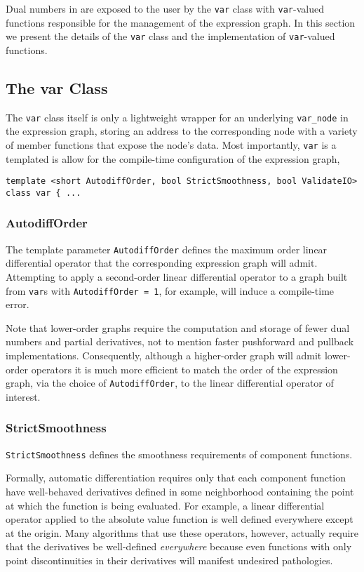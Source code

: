 Dual numbers in \nomad are exposed to the user by the \verb|var|
class with \verb|var|-valued functions responsible for the management
of the expression graph.  In this section we present the details of
the \verb|var| class and the implementation of \verb|var|-valued functions.

\subsection{The var Class}

The \verb|var| class itself is only a lightweight wrapper for an underlying 
\verb|var_node| in the expression graph, storing an address to the 
corresponding node with a variety of member functions that expose the 
node's data.  Most importantly, \verb|var| is a templated is allow for
the compile-time configuration of the expression graph,
%
\begin{verbatim}
template <short AutodiffOrder, bool StrictSmoothness, bool ValidateIO>
class var { ...
\end{verbatim}

\subsubsection{AutodiffOrder}

The template parameter \verb|AutodiffOrder| defines the maximum order
linear differential operator that the corresponding expression graph will
admit.  Attempting to apply a second-order linear differential operator
to a graph built from \verb|var|s with \verb|AutodiffOrder = 1|, for example,
will induce a compile-time error.

Note that lower-order graphs require the computation and storage of
fewer dual numbers and partial derivatives, not to mention faster pushforward
and pullback implementations.  Consequently, although a higher-order
graph will admit lower-order operators it is much more efficient to match
the order of the expression graph, via the choice of \verb|AutodiffOrder|,
to the linear differential operator of interest.

\subsubsection{StrictSmoothness}

\verb|StrictSmoothness| defines the smoothness requirements of 
component functions.

Formally, automatic differentiation requires only that each component
function have well-behaved derivatives defined in some neighborhood
containing the point at which the function is being evaluated.  For
example, a linear differential operator applied to the absolute value
function is well defined everywhere except at the origin.  Many
algorithms that use these operators, however, actually require that
the derivatives be well-defined \textit{everywhere} because even 
functions with only point discontinuities in their derivatives will
manifest undesired pathologies.

